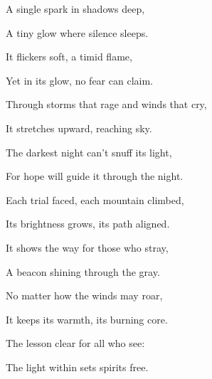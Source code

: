 \documentclass[12pt]{article}
\begin{document}
\begin{tcolorbox}[colframe=black!60, colback=white, 
coltitle=black, colbacktitle=black!15, fonttitle=\bfseries\Large, 
title=\textit{The Light Within}, halign title=center, left=10pt, right=10pt, top=10pt, bottom=15pt]

A single spark in shadows deep,

A tiny glow where silence sleeps.

It flickers soft, a timid flame,

Yet in its glow, no fear can claim.

Through storms that rage and winds that cry,

It stretches upward, reaching sky.

The darkest night can’t snuff its light,

For hope will guide it through the night.

Each trial faced, each mountain climbed,

Its brightness grows, its path aligned.

It shows the way for those who stray,

A beacon shining through the gray.

No matter how the winds may roar,

It keeps its warmth, its burning core.

The lesson clear for all who see:

The light within sets spirits free.

 

\end{tcolorbox}

\vspace{1em}
\end{document}
